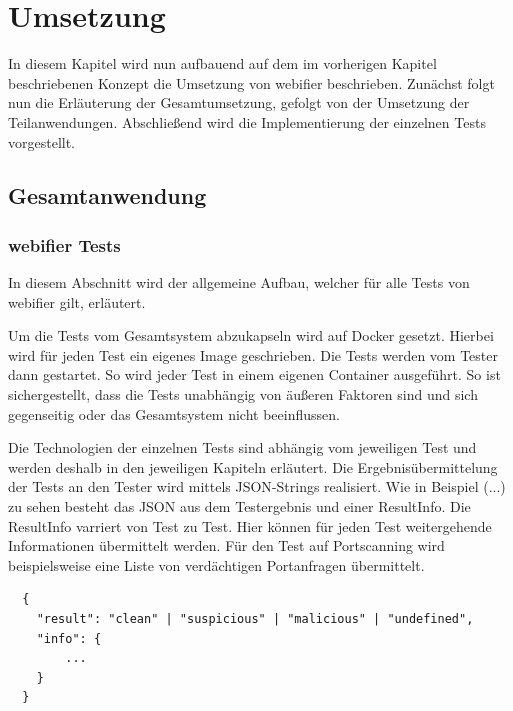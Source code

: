 \chapter{Umsetzung}

In diesem Kapitel wird nun aufbauend auf dem im vorherigen Kapitel beschriebenen Konzept die Umsetzung von webifier beschrieben. Zunächst folgt nun die Erläuterung der Gesamtumsetzung, gefolgt von der Umsetzung der Teilanwendungen. Abschließend wird die Implementierung der einzelnen Tests vorgestellt.

\section{Gesamtanwendung}


\subsection{webifier Tests}
In diesem Abschnitt wird der allgemeine Aufbau, welcher für alle Tests von webifier gilt, erläutert.

Um die Tests vom Gesamtsystem abzukapseln wird auf Docker gesetzt. Hierbei wird für jeden Test ein eigenes Image geschrieben. Die Tests werden vom Tester dann gestartet. So wird jeder Test in einem eigenen Container ausgeführt. So ist sichergestellt, dass die Tests unabhängig von äußeren Faktoren sind und sich gegenseitig oder das Gesamtsystem nicht beeinflussen.

Die Technologien der einzelnen Tests sind abhängig vom jeweiligen Test und werden deshalb in den jeweiligen Kapiteln erläutert. Die Ergebnisübermittelung der Tests an den Tester wird mittels \ac{JSON}-Strings realisiert. Wie in Beispiel (...) zu sehen besteht das \ac{JSON} aus dem Testergebnis und einer ResultInfo. Die ResultInfo varriert von Test zu Test. Hier können für jeden Test weitergehende Informationen übermittelt werden. Für den Test auf Portscanning wird beispielsweise eine Liste von verdächtigen Portanfragen übermittelt.

\begin{scriptsize}
\begin{lstlisting}
  {
  	"result": "clean" | "suspicious" | "malicious" | "undefined",
  	"info": {
  		...
  	}
  }
\end{lstlisting}
\end{scriptsize}

